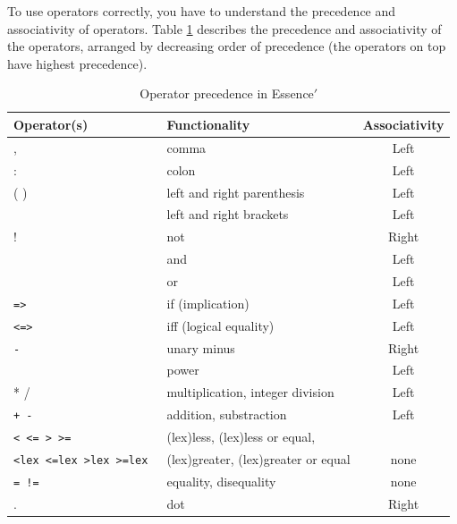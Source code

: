 \documentclass[oneside]{book}
\begin{document}
To use operators correctly, you have to understand the precedence and associativity of operators. 
Table \ref{tab:precedence} 
describes the precedence and associativity of the operators, arranged by decreasing order of precedence (the operators on top have highest precedence).



\begin{table}  
    \begin{center}
    \begin{tabular}{|l|lc|}
 
      \hline
       Operator(s) & Functionality & Associativity \\
       \hline
       \hline
       ,   & comma & Left \\   
       \hline
       :   & colon & Left \\
       \hline
       ( ) & left and right parenthesis & Left \\
       \hline
       \verb1[ ]1 & left and right brackets & Left \\
       \hline
       ! & not & Right \\  
       \hline
       \verb1/\1 & and & Left \\ 
       \hline
       \verb1\/1 & or & Left \\ 
       \hline
        {\tt =>} & if (implication)  & Left \\ 
	\hline
        {\tt <=>} & iff (logical equality) & Left \\ 
	\hline
        {\tt -} & unary minus & Right \\
	\hline
        \verb1^1 & power & Left \\ 
	\hline
        * / & multiplication, integer division & Left \\ 
	\hline
        {\tt + -} & addition, substraction &  Left \\
	\hline
        {\tt < <= > >= } & (lex)less, (lex)less or equal, &  \\ 
	{\tt <lex <=lex >lex >=lex } & (lex)greater, (lex)greater or equal & none \\ 
	\hline
        {\tt = !=} & equality, disequality & none \\
	\hline
        . & dot & Right \\ 
	\hline

      \end{tabular}
\end{center}
    \caption{Operator precedence in {\sc Essence}$'$}

\label{tab:precedence}
\end{table}
\end{document}

